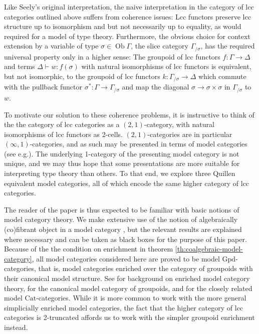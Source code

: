 \documentclass[a4paper]{article}
\theoremstyle{remark}
\theoremstyle{definition}
\begin{document}
Like Seely's original interpretation, the naive interpretation in the category of lcc categories outlined above suffers from coherence issues:
Lcc functors preserve lcc structure up to isomorphism and but not necessarily up to equality, as would required for a model of type theory.
Furthermore, the obvious choice for context extension by a variable of type $\sigma \in \operatorname{Ob} \Gamma$, the slice category $\Gamma_{/ \sigma}$, has the required universal property only in a higher sense:
The groupoid of lcc functors $f : \Gamma \rightarrow \Delta$ and terms $\Delta \vdash w : f(\sigma)$ with natural isomorphisms of lcc functors is equivalent, but not isomorphic, to the groupoid of lcc functors $k : \Gamma_{/ \sigma} \rightarrow \Delta$ which commute with the pullback functor $\sigma^* : \Gamma \rightarrow \Gamma_{/ \sigma}$ and map the diagonal $\sigma \rightarrow \sigma \times \sigma$ in $\Gamma_{/ \sigma}$ to $w$.

To motivate our solution to these coherence problems, it is instructive to think of the the category of lcc categories as a $(2, 1)$-category, with natural isomorphisms of lcc functors as 2-cells.
$(2, 1)$-categories are in particular $(\infty, 1)$-categories, and as such may be presented in terms of model categories (see e.g.\@ \cite{hirschhorn}).
The underlying 1-category of the presenting model category is not unique, and we may thus hope that some presentations are more suitable for interpreting type theory than others.
To that end, we explore three Quillen equivalent model categories, all of which encode the same higher category of lcc categories.

The reader of the paper is thus expected to be familiar with basic notions of model category theory.
We make extensive use of the notion of algebraically (co)fibrant object in a model category \cite{algebraic-models,coalgebraic-models}, but the relevant results are explained where necessary and can be taken as black boxes for the purpose of this paper.
Because of the the condition on enrichment in theorem \ref{th:coalgebraic-model-category}, all model categories considered here are proved to be model $\mathrm{Gpd}$-categories, that is, model categories enriched over the category of groupoids with their canonical model structure.
See \cite{enriched-model-cats} for background on enriched model category theory, \cite{groupoid-model-cat} for the canonical model category of groupoids, and \cite{homotopy-theoretic-aspects} for the closely related model $\mathrm{Cat}$-categories.
While it is more common to work with the more general simplicially enriched model categories, the fact that the higher category of lcc categories is 2-truncated affords us to work with the simpler groupoid enrichment instead.
\end{document}
